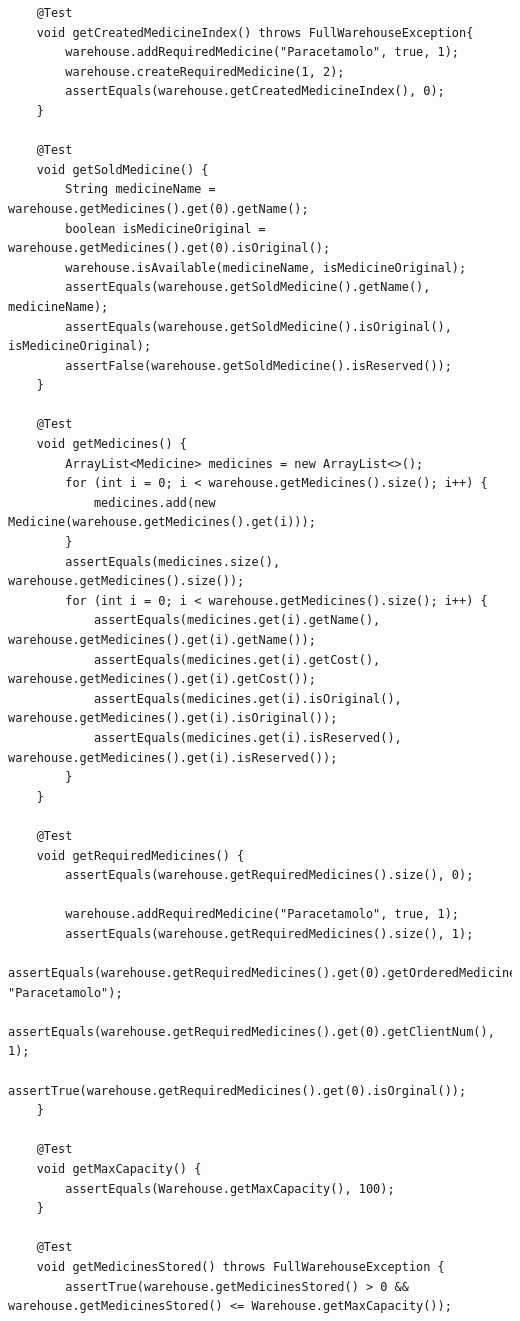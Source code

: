 \documentclass[a4paper, 10pt]{report}
\begin{document}
\begin{lstlisting}
    @Test
    void getCreatedMedicineIndex() throws FullWarehouseException{
        warehouse.addRequiredMedicine("Paracetamolo", true, 1);
        warehouse.createRequiredMedicine(1, 2);
        assertEquals(warehouse.getCreatedMedicineIndex(), 0);
    }

    @Test
    void getSoldMedicine() {
        String medicineName = warehouse.getMedicines().get(0).getName();
        boolean isMedicineOriginal = warehouse.getMedicines().get(0).isOriginal();
        warehouse.isAvailable(medicineName, isMedicineOriginal);
        assertEquals(warehouse.getSoldMedicine().getName(), medicineName);
        assertEquals(warehouse.getSoldMedicine().isOriginal(), isMedicineOriginal);
        assertFalse(warehouse.getSoldMedicine().isReserved());
    }

    @Test
    void getMedicines() {
        ArrayList<Medicine> medicines = new ArrayList<>();
        for (int i = 0; i < warehouse.getMedicines().size(); i++) {
            medicines.add(new Medicine(warehouse.getMedicines().get(i)));
        }
        assertEquals(medicines.size(), warehouse.getMedicines().size());
        for (int i = 0; i < warehouse.getMedicines().size(); i++) {
            assertEquals(medicines.get(i).getName(), warehouse.getMedicines().get(i).getName());
            assertEquals(medicines.get(i).getCost(), warehouse.getMedicines().get(i).getCost());
            assertEquals(medicines.get(i).isOriginal(), warehouse.getMedicines().get(i).isOriginal());
            assertEquals(medicines.get(i).isReserved(), warehouse.getMedicines().get(i).isReserved());
        }
    }

    @Test
    void getRequiredMedicines() {
        assertEquals(warehouse.getRequiredMedicines().size(), 0);

        warehouse.addRequiredMedicine("Paracetamolo", true, 1);
        assertEquals(warehouse.getRequiredMedicines().size(), 1);
        assertEquals(warehouse.getRequiredMedicines().get(0).getOrderedMedicineName(), "Paracetamolo");
        assertEquals(warehouse.getRequiredMedicines().get(0).getClientNum(), 1);
        assertTrue(warehouse.getRequiredMedicines().get(0).isOrginal());
    }

    @Test
    void getMaxCapacity() {
        assertEquals(Warehouse.getMaxCapacity(), 100);
    }

    @Test
    void getMedicinesStored() throws FullWarehouseException {
        assertTrue(warehouse.getMedicinesStored() > 0 && warehouse.getMedicinesStored() <= Warehouse.getMaxCapacity());


\end{lstlisting}
\end{document}
